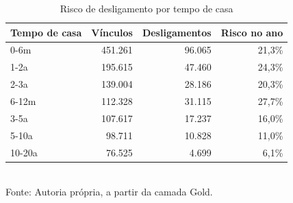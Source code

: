 \begin{table}[htbp]
    \centering
    \caption{Risco de desligamento por tempo de casa}
    \label{tab:risco}
    \footnotesize
    \renewcommand{\arraystretch}{1.25}
    \begin{tabular}{lrrr}
        \toprule
        \rowcolor{black!8}
        \textbf{Tempo de casa} & \textbf{Vínculos} & \textbf{Desligamentos} & \textbf{Risco no ano} \\
        \midrule
        0-6m & 451.261 & 96.065 & 21,3\% \\
        1-2a & 195.615 & 47.460 & 24,3\% \\
        2-3a & 139.004 & 28.186 & 20,3\% \\
        6-12m & 112.328 & 31.115 & 27,7\% \\
        3-5a & 107.617 & 17.237 & 16,0\% \\
        5-10a & 98.711 & 10.828 & 11,0\% \\
        10-20a & 76.525 & 4.699 & 6,1\% \\
        \bottomrule
    \end{tabular}
    \\[4pt]
    Fonte: Autoria própria, a partir da camada Gold.
\end{table}

